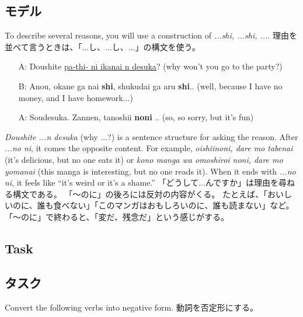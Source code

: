 \documentclass[uplatex,dvipdfmx,b5paper,english,10pt]{jsbook}
\begin{document}
\subsection{モデル}
\fi

\begin{toiquestion}
\ifEnglish
To describe several reasons, you will use a construction of {\it ...shi, ...shi, ...\/}.
\else
理由を並べて言うときは、「...し、...し、...」の構文を使う。
\fi
\end{toiquestion}

\begin{itemize}
\item[A:] Doushite \underline{pa-thi- ni ikanai n desuka}? (why won't you go to the party?)
\item[B:] Anou, okane ga nai {\bfseries shi}, shukudai ga aru {\bfseries shi}.. (well, because I have no money, and I have homework...)
\item[A:] Soudesuka. Zannen, tanoshii {\bfseries noni} .. (so, so sorry, but it's fun)
\end{itemize}

\begin{toianswer}
\ifEnglish
{\it Doushite ...n desuka\/} (why ...?) is a sentence structure for asking the reason.
After {\it ...no ni\/}, it comes the opposite content.
For example, {\it oishiinoni, dare mo tabenai\/} (it's delicious, but no one eats it) or {\it kono manga wa omoshiroi noni, dare mo yomanai\/} (this manga is interesting, but no one reads it).
When it ends with {\it ...no ni\/}, it feels like ``it's weird or it's a shame.''
\else
「どうして...んですか」は理由を尋ねる構文である。
「～のに」の後ろには反対の内容がくる。
たとえば、「おいしいのに、誰も食べない」「このマンガはおもしろいのに、誰も読まない」など。
「～のに」で終わると、「変だ、残念だ」という感じがする。
\fi
\end{toianswer}

\ifEnglish
\subsection{Task}
\else
\subsection{タスク}
\fi

\begin{toiquestion}
\ifEnglish
Convert the following verbs into negative form.
\else
動詞を否定形にする。
\fi
\end{toiquestion}
\end{document}
